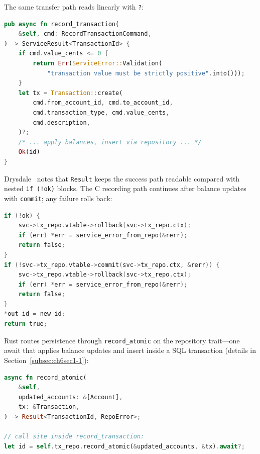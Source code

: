 The same transfer path reads linearly with \texttt{?}:

\noindent\begin{minipage}{\linewidth}
\begin{lstlisting}[language=Rust, caption={transaction.rs (service) ---
\texttt{record\_transaction} propagates failures with \texttt{?}.}]
pub async fn record_transaction(
    &self, cmd: RecordTransactionCommand,
) -> ServiceResult<TransactionId> {
    if cmd.value_cents <= 0 {
        return Err(ServiceError::Validation(
            "transaction value must be strictly positive".into()));
    }
    let tx = Transaction::create(
        cmd.from_account_id, cmd.to_account_id,
        cmd.transaction_type, cmd.value_cents,
        cmd.description,
    )?;
    /* ... apply balances, insert via repository ... */
    Ok(id)
}
\end{lstlisting}\end{minipage}

Drysdale~\cite{Drysdale2024} notes that \texttt{Result} keeps the success path readable
compared with nested \texttt{if (!ok)} blocks. The C recording path continues after
balance updates with \texttt{commit}; any failure rolls back:

\begin{lstlisting}[language=C, caption={transaction\_service.c --- Commit only after
insert succeeds; otherwise rollback.}]
if (!ok) {
    svc->tx_repo.vtable->rollback(svc->tx_repo.ctx);
    if (err) *err = service_error_from_repo(&rerr);
    return false;
}
if (!svc->tx_repo.vtable->commit(svc->tx_repo.ctx, &rerr)) {
    svc->tx_repo.vtable->rollback(svc->tx_repo.ctx);
    if (err) *err = service_error_from_repo(&rerr);
    return false;
}
*out_id = new_id;
return true;
\end{lstlisting}

Rust routes persistence through \texttt{record\_atomic} on the repository trait---one
await that applies balance updates and insert inside a SQL transaction (details in
Section~\ref{subsec:ch6sec1-1}):

\begin{lstlisting}[language=Rust, caption={transaction.rs (service) --- Trait method
that wraps balance \texttt{UPDATE}s and row \texttt{INSERT} in one SQL transaction.}]
async fn record_atomic(
    &self,
    updated_accounts: &[Account],
    tx: &Transaction,
) -> Result<TransactionId, RepoError>;

// call site inside record_transaction:
let id = self.tx_repo.record_atomic(&updated_accounts, &tx).await?;
\end{lstlisting}

